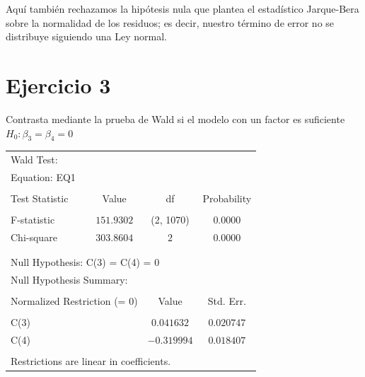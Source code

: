 \documentclass[12pt]{article}
\numberwithin{equation}{section} %
\begin{document}
Aquí también rechazamos la hipótesis nula que plantea el estadístico Jarque-Bera sobre la normalidad de los residuos; es decir, nuestro término de error no se distribuye siguiendo una Ley normal.

\section{Ejercicio 3} Contrasta mediante la prueba de Wald si el modelo con un factor es suficiente $H_0: \beta_3 = \beta_4 = 0$

\begin{table}[H]
\centering
\begin{tabular}{lrrr}
\multicolumn{1}{l}{Wald Test:}&\multicolumn{1}{c}{}&\multicolumn{1}{c}{}&\multicolumn{1}{c}{}\\
\multicolumn{2}{l}{Equation: EQ1}&\multicolumn{1}{c}{}&\multicolumn{1}{c}{}\\
[4.5pt] \hline \\ [-4.5pt]
\multicolumn{1}{l}{Test Statistic}&\multicolumn{1}{c}{Value}&\multicolumn{1}{c}{df}&\multicolumn{1}{c}{Probability}\\
[4.5pt] \hline \\ [-4.5pt]
\multicolumn{1}{l}{F-statistic}&\multicolumn{1}{c}{$151.9302$}&\multicolumn{1}{c}{(2, 1070)}&\multicolumn{1}{c}{$0.0000$}\\
\multicolumn{1}{l}{Chi-square}&\multicolumn{1}{c}{$303.8604$}&\multicolumn{1}{c}{$2$}&\multicolumn{1}{c}{$0.0000$}\\
[4.5pt] \hline \\ [-4.5pt]
\multicolumn{1}{c}{}&\multicolumn{1}{c}{}&\multicolumn{1}{c}{}&\multicolumn{1}{c}{}\\
\multicolumn{3}{l}{Null Hypothesis: C(3) = C(4) = 0}&\multicolumn{1}{c}{}\\
\multicolumn{2}{l}{Null Hypothesis Summary:}&\multicolumn{1}{c}{}&\multicolumn{1}{c}{}\\
[4.5pt] \hline \\ [-4.5pt]
\multicolumn{2}{l}{Normalized Restriction (= 0)}&\multicolumn{1}{c}{Value}&\multicolumn{1}{c}{Std. Err.}\\
[4.5pt] \hline \\ [-4.5pt]
\multicolumn{2}{l}{C(3)}&\multicolumn{1}{c}{$0.041632$}&\multicolumn{1}{c}{$0.020747$}\\
\multicolumn{2}{l}{C(4)}&\multicolumn{1}{c}{$-0.319994$}&\multicolumn{1}{c}{$0.018407$}\\
[4.5pt] \hline \\ [-4.5pt]
\multicolumn{3}{l}{Restrictions are linear in coefficients.}&\multicolumn{1}{c}{}\\
\end{tabular}
\end{table}
\end{document}
